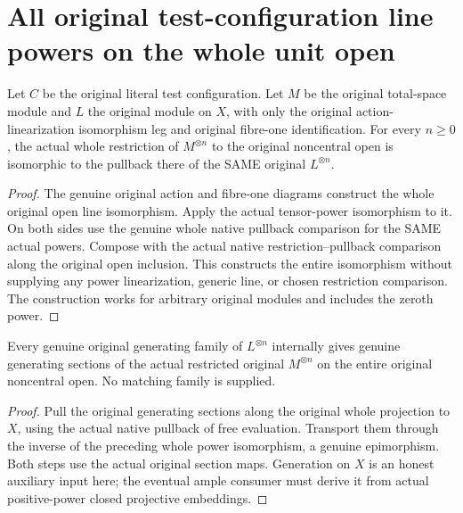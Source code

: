 \section{All original test-configuration line powers on the whole unit open}

\begin{proposition}
\label{prop:native-test-configuration-line-powers}
\leanok
{}
Let $C$ be the original literal test configuration. Let $M$ be
the original total-space module and $L$ the original module on
$X$, with only the original action-linearization isomorphism
leg and original fibre-one identification. For every $n\geq0$,
the actual whole restriction of $M^{\otimes n}$ to the original
noncentral open is isomorphic to the pullback there of the
SAME original $L^{\otimes n}$.
\end{proposition}
\begin{proof}
The genuine original action and fibre-one diagrams construct
the whole original open line isomorphism. Apply the actual
tensor-power isomorphism to it. On both sides use the genuine
whole native pullback comparison for the SAME actual powers.
Compose with the actual native restriction--pullback comparison
along the original open inclusion. This constructs the entire
isomorphism without supplying any power linearization, generic
line, or chosen restriction comparison. The construction works
for arbitrary original modules and includes the zeroth power.
\end{proof}

\begin{proposition}
\label{prop:native-test-configuration-line-power-generation}
\leanok
{}
Every genuine original generating family of $L^{\otimes n}$
internally gives genuine generating sections of the actual
restricted original $M^{\otimes n}$ on the entire original
noncentral open. No matching family is supplied.
\end{proposition}
\begin{proof}
Pull the original generating sections along the original whole
projection to $X$, using the actual native pullback of free
evaluation. Transport them through the inverse of the preceding
whole power isomorphism, a genuine epimorphism. Both steps use
the actual original section maps. Generation on $X$ is an honest
auxiliary input here; the eventual ample consumer must derive it
from actual positive-power closed projective embeddings.
\end{proof}
